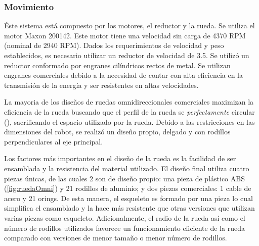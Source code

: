 \documentclass[twocolumn,10pt]{amrob}
\begin{document}
\subsubsection*{Movimiento}
\label{sec:sistema_movimiento}
Éste sistema está compuesto por los motores, el reductor y la rueda. Se utiliza el motor Maxon 200142. Este motor tiene una velocidad sin carga de 4370 RPM (nominal de 2940 RPM). Dados los requerimientos de velocidad y peso establecidos, es necesario utilizar un reductor de velocidad de 3.5. Se utilizó un reductor conformado por engranes cilíndricos rectos de metal. Se utilizan engranes comerciales debido a la necesidad de contar con alta eficiencia en la transmisión de la energía y ser resistentes en altas velocidades.

La mayoria de los diseños de ruedas omnidireccionales comerciales maximizan la eficiencia de la rueda buscando que el perfil de la rueda se \textit{perfectamente} circular (\cite{rojas2005short}), sacrificando el espacio utilizado por la rueda. Debido a las restricciones en las dimensiones del robot, se realizó un diseño propio, delgado y con rodillos perpendiculares al eje principal.

Los factores más importantes en el diseño de la rueda es la facilidad de ser ensamblada y la resistencia del material utilizado. El diseño final utiliza cuatro piezas únicas, de las cuales 2 son de diseño propio: una pieza de plástico ABS (\ref{fig:ruedaOmni}) y 21 rodillos de aluminio; y dos piezas comerciales: 1 cable de acero y 21 orings. De esta manera, el esqueleto es formado por una pieza lo cual simplifica el ensamblado y la hace más resistente que otras versiones que utilizan varias piezas como esqueleto. Adicionalmente, el radio de la rueda así como el número de rodillos utilizados favorece un funcionamiento eficiente de la rueda comparado con versiones de menor tamaño o menor número de rodillos.
\end{document}
